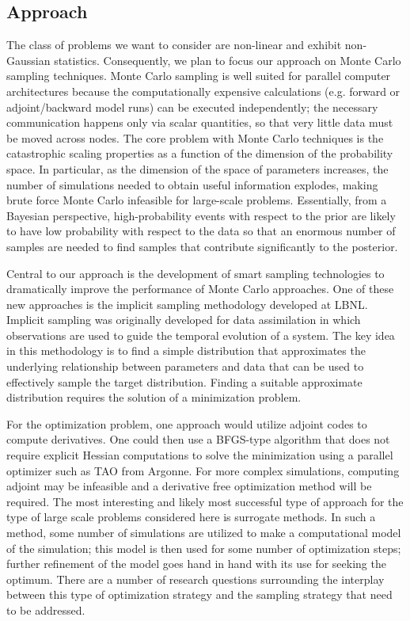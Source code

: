 \documentclass[11pt]{article}
\begin{document}
\subsection*{Approach}

The class of problems we want to consider are non-linear and exhibit non-Gaussian statistics.
Consequently, we plan to focus our approach on Monte Carlo sampling techniques.
Monte Carlo sampling is well suited for parallel computer architectures because the computationally
expensive calculations (e.g. forward or adjoint/backward model runs) can be executed independently;
the necessary communication happens only via scalar quantities, so that very little data must be moved
across nodes.
The core problem with Monte Carlo techniques is the catastrophic scaling properties as a function of the
dimension of the probability space.  In particular, as the dimension of the space of parameters increases,
the number of simulations needed to obtain useful information explodes, making brute force Monte Carlo
infeasible for large-scale problems.
Essentially, from a Bayesian perspective, high-probability events with respect to the prior are likely
to have low probability with respect to the data so that an enormous number of samples are needed to
find samples that contribute significantly to the posterior.

Central to our approach is the development of smart sampling technologies to dramatically improve
the performance of Monte Carlo approaches.
One of these new approaches is the implicit sampling methodology developed at LBNL.
Implicit sampling was originally developed for data assimilation in which observations are used
to guide the temporal evolution of a system.  The key idea in this methodology is to find a simple distribution
that approximates the underlying relationship between parameters and data that can be used to
effectively sample the target distribution.  Finding a suitable approximate distribution requires
the solution of a minimization problem.

For the optimization problem, one approach would utilize adjoint codes to compute derivatives.
One could then use a BFGS-type algorithm that does not require explicit Hessian computations to
solve the minimization
using a parallel optimizer such as TAO from Argonne.
For more complex simulations, computing adjoint may be infeasible and a derivative free optimization
method will be required.
The most interesting and likely most successful type of approach
for the type of large scale problems considered here is
surrogate methods.  In such a method, some number of simulations are utilized to make
a computational model of the simulation; this model is then 
used for some number of optimization steps;  further refinement of the model goes hand in hand
with its use for seeking the optimum.
There are a number of research questions surrounding the interplay between this type of optimization
strategy and the sampling strategy that need to be addressed.
\end{document}
